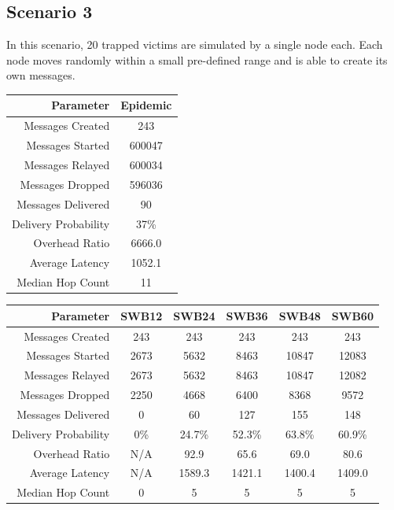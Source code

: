 \documentclass{article}
\begin{document}
\restoregeometry

\clearpage

\subsection{Scenario 3}
In this scenario, 20 trapped victims are simulated by a single node each. Each node moves randomly within a small pre-defined range and is able to create its own messages.

\begin{center}
\begin{tabular}{|r|c|}
\hline
\textbf{Parameter} & \textbf{Epidemic} \\ \hline
Messages Created & 243 \\ \hline
Messages Started & 600047 \\ \hline
Messages Relayed & 600034 \\ \hline
Messages Dropped & 596036 \\ \hline
Messages Delivered & 90 \\ \hline
Delivery Probability & 37\%\\ \hline
Overhead Ratio & 6666.0 \\ \hline
Average Latency & 1052.1 \\ \hline
Median Hop Count & 11 \\ \hline
\end{tabular}
\end{center}

\begin{center}
\begin{tabular}{|r|c|c|c|c|c|}
\hline
\textbf{Parameter} & \textbf{SWB12} & \textbf{SWB24} & \textbf{SWB36} & \textbf{SWB48} & \textbf{SWB60} \\ \hline
Messages Created & 243 & 243 & 243 & 243 & 243 \\ \hline
Messages Started & 2673 & 5632 & 8463 & 10847 & 12083 \\ \hline
Messages Relayed & 2673 & 5632 & 8463 & 10847 & 12082 \\ \hline
Messages Dropped & 2250 & 4668 & 6400 & 8368 & 9572 \\ \hline
Messages Delivered & 0 & 60 & 127 & 155 & 148 \\ \hline
Delivery Probability & 0\% & 24.7\% & 52.3\% & 63.8\% & 60.9\% \\ \hline
Overhead Ratio & N/A & 92.9 & 65.6 & 69.0 & 80.6 \\ \hline
Average Latency & N/A & 1589.3 & 1421.1 & 1400.4 & 1409.0 \\ \hline
Median Hop Count & 0 & 5 & 5 & 5 & 5 \\ \hline
\end{tabular}
\end{center}
\end{document}
